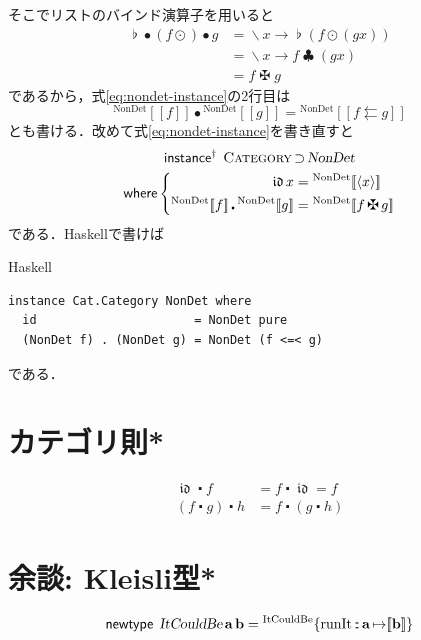 \documentclass[a5paper,twoside,fleqn,draft]{jsbook}
\def\[{[\![}
\def\]{]\!]}
\newcommand{\programminglanguage}[1]{\textsf{#1}}
\newcommand{\haskell}{\programminglanguage{Haskell}}
\newenvironment{haskellcode}{\begin{itembox}[r]{\haskell}}{\end{itembox}}
\newcommand{\mKeyword}[1]{\mathsf{#1}}
\newcommand{\mInstanceDeclKeyword}{\mKeyword{instance}}
\newcommand{\mNewTypeDeclKeyword}{\mKeyword{newtype}}
\newcommand{\mWhereKeyword}{\mKeyword{where}}
\DeclareMathOperator{\mInstanceDeclPolymorphic}{\mInstanceDeclKeyword^{\dagger}}
\DeclareMathOperator{\mNewTypeDecl}{\mNewTypeDeclKeyword}
\DeclareMathOperator{\mSuperSet}{\supset}
\DeclareMathOperator{\mWhere}{\mWhereKeyword}
\newcommand{\mVarSpecialFunc}[1]{\mathfrak{#1}}
\DeclareMathOperator{\mIdCat}{\mVarSpecialFunc{id}}
\DeclareMathOperator{\mBindComp}{\maltese}
\DeclareMathOperator{\mBindList}{\clubsuit}
\DeclareMathOperator{\mComp}{\bullet}
\DeclareMathOperator{\mCompCat}{\centerdot}
\DeclareMathOperator{\mIn}{{:\!:}}
\DeclareMathOperator{\mJoinList}{\flat} %
\DeclareMathOperator{\mLambda}{\backslash}
\DeclareMathOperator{\mLambdaArrow}{\rightarrow}
\DeclareMathOperator{\mMapList}{\odot}
\DeclareMathOperator{\mMapsTo}{\mapsto}
\newcommand{\mType}[1]{\mathbf{#1}} %
\newcommand{\mA}{\mType{a}}
\newcommand{\mB}{\mType{b}}
\newcommand{\mTypeAssemble}[2]{{}^{\mType{#1}}\[\mType{#2}\]}
\newcommand{\mMaybeType}[1]{\[\mType{#1}\]}%
\newcommand{\mTypeConstructor}[1]{\textsl{#1}}
\newcommand{\mValueConstructor}[1]{\mathrm{#1}}
\newcommand{\mValueWith}[2]{{}^\mValueConstructor{#1}\[#2\]}
\newcommand{\mValueRecordWith}[2]{{}^\mValueConstructor{#1}\{#2\}}
\newcommand{\mPureWith}[1]{\langle#1\rangle}
\newcommand{\mTypeClass}[1]{\textsc{#1}} %
\newcommand{\mCategoryTypeClass}{\mTypeClass{Category}}
\begin{document}
そこでリストのバインド演算子を用いると
\begin{align}
  \mJoinList\mComp(f\mMapList)\mComp g
  &=\mLambda x\mLambdaArrow\mJoinList(f\mMapList(gx))\\
  &=\mLambda x\mLambdaArrow f\mBindList(gx)\\
  &=f\mBindComp g
\end{align}
であるから，式\eqref{eq:nondet-instance}の2行目は
\begin{equation}
  \mValueWith{NonDet}{f}\mComp\mValueWith{NonDet}{g}
  =\mValueWith{NonDet}{f\leftleftarrows g}
\end{equation}
とも書ける．改めて式\eqref{eq:nondet-instance}を書き直すと
\begin{multline}
  \mInstanceDeclPolymorphic\;
  \mCategoryTypeClass\mSuperSet\mTypeConstructor{NonDet}\\
  \mWhere\left\{
  \begin{aligned}
    \mIdCat x
    &=\mValueWith{NonDet}{\mPureWith{x}}\\
    \mValueWith{NonDet}{f}\mCompCat\mValueWith{NonDet}{g}
    &=\mValueWith{NonDet}{f\mBindComp g}
  \end{aligned}
  \right.
\end{multline}
である．\haskell で書けば
\begin{haskellcode}
\begin{verbatim}
instance Cat.Category NonDet where
  id                      = NonDet pure
  (NonDet f) . (NonDet g) = NonDet (f <=< g)
\end{verbatim}
\end{haskellcode}
である．

\section{カテゴリ則*}

\begin{align}
\mIdCat\mCompCat f&=f\mCompCat\mIdCat=f\\
(f\mCompCat g)\mCompCat h&=f\mCompCat(g\mCompCat h)
\end{align}

\section{余談: Kleisli型*}

\begin{equation}
  \mNewTypeDecl\;
  \mTypeConstructor{ItCouldBe}\,\mA\,\mB
  =\mValueRecordWith{ItCouldBe}{\mathrm{runIt}\mIn\mA\mMapsTo\mMaybeType{b}}
\end{equation}
\end{document}
